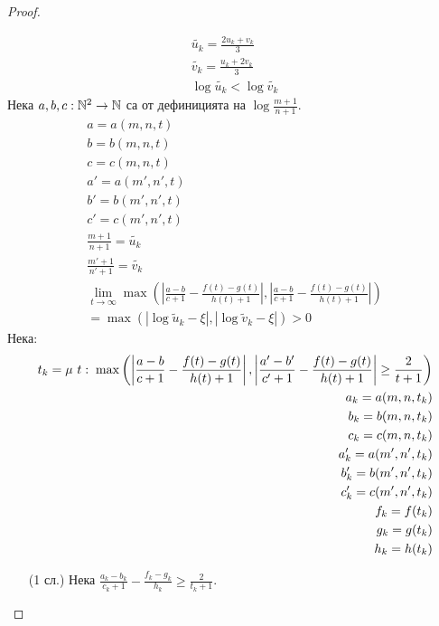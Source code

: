 \begin{proof}
\begin{itemize}
        \begin{equation}
            \begin{split}
            \tilde{u_k} = \frac{2u_k + v_k}{3} \\
            \tilde{v_k} = \frac{u_k + 2v_k}{3} \\
            \log \tilde{u_k} < \log \tilde{v_k}
            \end{split}
        \end{equation}
        Нека $a,b,c: {\mathbb{N}}^2 \to {\mathbb{N}}$ са от дефиницията на $\log \frac{m+1}{n+1}$.
        \begin{equation}
            \begin{split}
                a = a(m,n,t)\\
                b = b(m,n,t)\\
                c = c(m,n,t)\\
                a' = a(m',n',t)\\
                b' = b(m',n',t)\\
                c' = c(m',n',t)\\
                \frac{m+1}{n+1} = \tilde{u_k} \\
                \frac{m'+1}{n'+1} = \tilde{v_k} \\
                \lim_{t\to\infty} \max \left( \left| \frac{a - b}{c + 1} - \frac{f(t)-g(t)}{h(t) + 1} \right|,\left| \frac{a - b}{c + 1} - \frac{f(t)-g(t)}{h(t) + 1} \right| \right) \\
                = \max (|\log \tilde u_k - \xi|, |\log \tilde v_k - \xi|) > 0
            \end{split}
        \end{equation}
        Нека:
        \begin{equation}
            \begin{split}
                t_k = \mu\ t:\; \max\left(\left|\frac{a - b}{c+1} - \frac{f(t)-g(t)}{h(t)+1}\right|, \left|\frac{a' - b'}{c'+1} - \frac{f(t)-g(t)}{h(t)+1}\right| \geq \frac{2}{t+1}\right) \\
                a_k = a(m,n,t_k)\\
                b_k = b(m,n,t_k)\\
                c_k = c(m,n,t_k)\\
                a_k' = a(m',n',t_k)\\
                b_k' = b(m',n',t_k)\\
                c_k' = c(m',n',t_k)\\
                f_k = f(t_k) \\
                g_k = g(t_k) \\
                h_k = h(t_k)
            \end{split}
        \end{equation}
        \begin{itemize}
            \item[(1 сл.)] Нека $\frac{a_k - b_k}{c_k + 1} - \frac{f_k - g_k}{h_k} \geq \frac{2}{t_k+1}$.
            

\end{itemize}
\end{itemize}
\end{proof}
